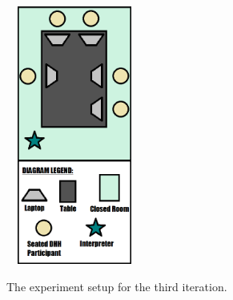 \documentclass{sigchi-ext}
\begin{document}
\begin{marginfigure}[0.5pc]
\begin{minipage}{\marginparwidth}
     \includegraphics[width=4.5cm,height=8.5cm]{figures/iter3SetupVector.png}
    \caption{The experiment setup for the third iteration.}
    \label{fig:iter3SetupVector}
    \end{minipage}
\end{marginfigure}
\end{document}
